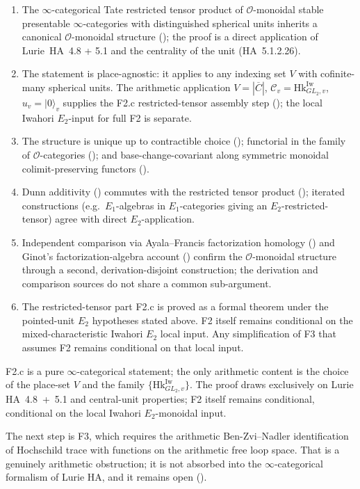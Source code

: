 \begin{enumerate}
\item The \(\infty\)-categorical Tate restricted tensor product of
\(\mathcal{O}\)-monoidal stable presentable \(\infty\)-categories with
distinguished spherical units inherits a canonical
\(\mathcal{O}\)-monoidal structure
(); the proof is a direct
application of Lurie~HA~4.8 + 5.1 and the centrality of the unit
(HA~5.1.2.26).
\item The statement is place-agnostic: it applies to any indexing
set \(V\) with cofinite-many spherical units. The arithmetic
application \(V=|\overline{C}|\), \(\mathcal{C}_{v}=\mathrm{Hk}^{\mathrm{Iw}}_{GL_{2},v}\),
\(u_{v}=|0\rangle_{v}\) supplies the F2.c restricted-tensor assembly
step (); the local Iwahori
\(E_{2}\)-input for full F2 is separate.
\item The structure is unique up to contractible choice
(); functorial in the family
of \(\mathcal{O}\)-categories
(); and
base-change-covariant along symmetric monoidal colimit-preserving
functors ().
\item Dunn additivity
() commutes with the
restricted tensor product
();
iterated constructions (e.g.~\(E_{1}\)-algebras in \(E_{1}\)-categories
giving an \(E_{2}\)-restricted-tensor) agree with direct
\(E_{2}\)-application.
\item Independent comparison via Ayala--Francis factorization
homology ()
and Ginot's factorization-algebra account
() confirm the
\(\mathcal{O}\)-monoidal structure through a second, derivation-disjoint
construction; the derivation and comparison sources do not share a common
sub-argument.
\item The restricted-tensor part F2.c is proved as a formal theorem
under the pointed-unit \(E_{2}\) hypotheses stated above. F2 itself
remains conditional on the mixed-characteristic Iwahori \(E_{2}\)
local input. Any simplification of F3 that assumes F2 remains
conditional on that local input.
\end{enumerate}

F2.c is a pure \(\infty\)-categorical statement; the only arithmetic
content is the choice of the place-set \(V\) and the family
\(\{\mathrm{Hk}^{\mathrm{Iw}}_{GL_{2},v}\}\). The proof draws
exclusively on Lurie HA~4.8~+~5.1 and central-unit properties; F2
itself remains conditional, conditional on the local Iwahori
\(E_{2}\)-monoidal input.

The next step is F3, which requires the arithmetic
Ben-Zvi--Nadler identification of Hochschild trace with functions
on the arithmetic free loop space. That is a genuinely arithmetic
obstruction; it is not absorbed into the \(\infty\)-categorical
formalism of Lurie HA, and it remains open
().
